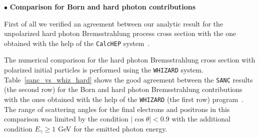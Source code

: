 \documentclass[%
 reprint,
amsmath,
amssymb,
 aps,
 prb,
 floatfix,
]{revtex4-1}
\begin{document}
$\bullet$ {\bf Comparison for Born and hard photon contributions}

First of all we verified an agreement between our analytic result for 
the unpolarized hard photon Bremsstrahlung 
process cross section with the one obtained with the help 
of the {\tt CalcHEP} system~\cite{Belyaev:2012qa}.

The numerical comparison for the hard photon Brem\-sstrahlung cross section 
with polarized initial particles is performed using the {\tt WHIZARD} system.
Table~\ref{sanc_vs_whiz_hard} shows the good agreement between 
the {\tt SANC} results (the second row) for the Born and hard photon Bremsstrahlung 
contributions with the ones obtained with the help of the {\tt WHIZARD} (the first row)
program~\cite{Ohl:2000pr}. 
The range of scattering angles for the final electrons and positrons in this comparison
was limited by the condition $|\cos\theta|<0.9$ with 
the additional condition $E_{\gamma} \geq 1$ GeV for the emitted photon energy. 
\end{document}
